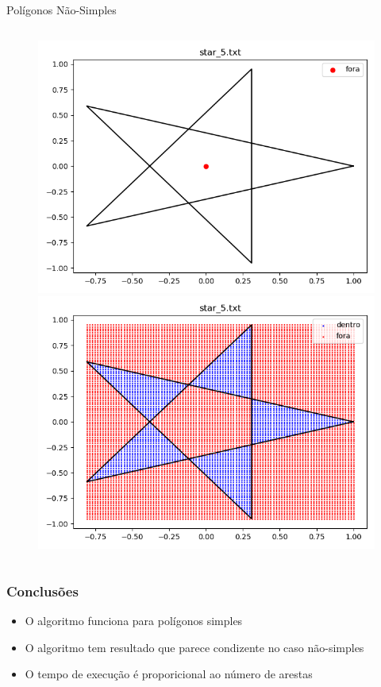\documentclass[aspectratio=169]{beamer}
\begin{document}
\begin{frame}{Polígonos Não-Simples}
\begin{columns}
    \begin{center}
      \begin{figure}
        \begin{overprint}
        \includegraphics[width=1.0\textwidth]{figures/star_5.png}
        \includegraphics[width=1.0\textwidth]{figures/star_5_grid.png}
        \end{overprint}
      \end{figure}
    \end{center}
  \end{columns}

\end{frame}


 

\begin{frame}
\frametitle{Conclusões}

\begin{itemize}
  \item O algoritmo funciona para polígonos simples
  \item O algoritmo tem resultado que parece condizente no caso não-simples
   \item O tempo de execução é proporicional ao número de arestas
\end{itemize}

\end{frame}
\end{document}
